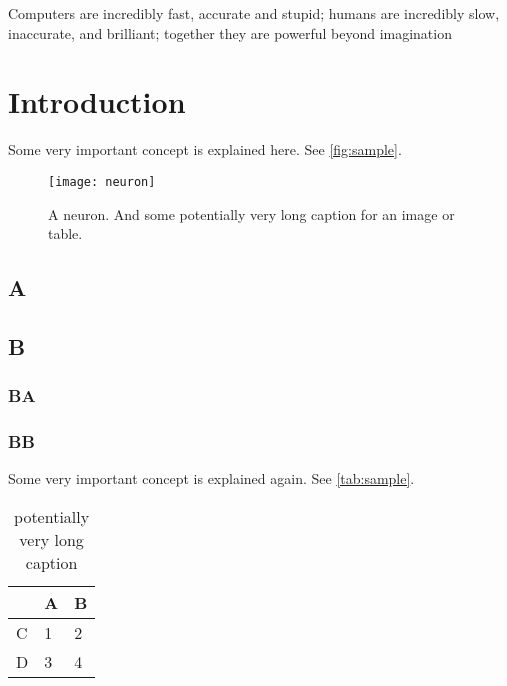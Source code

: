 

\begin{savequote}[8cm]
Computers are incredibly fast, accurate and stupid; humans are incredibly slow, inaccurate, and brilliant; together they are powerful beyond imagination
%
%
\end{savequote}

\chapter{Introduction}\label{ch:1-intro}%
%

\begin{chapterabstract}
  \kant[4]
\end{chapterabstract}

\minitoc

\kant[5]
Some very important concept is explained here. See \autoref{fig:sample}.

\begin{figure}[htb]
  \centering
  \texttt{[image: neuron]}
  \caption[A neuron. Some shorter caption for the LOF]{A neuron. And some potentially very long caption for an image or table.}\label{fig:sample}
\end{figure}

\section{A}
\kant[6-10]

\section{B}
\kant[11]

\subsection{BA}
\kant[12-14]

\subsection{BB}
\kant[14-16]
Some very important concept is explained again. See \autoref{tab:sample}.

\begin{table}
  \centering
  \begin{tabular}{lll}
    \toprule
     & A & B \\
    \midrule
    C & 1 & 2 \\
    D & 3 & 4 \\
    \bottomrule
  \end{tabular}\caption[shorter caption]{potentially very long caption}\label{tab:sample}
\end{table}

